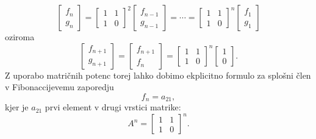 \documentclass[mat1]{fmfdelo}
\begin{document}
\begin{zgled} 
\begin{equation*}
\begin{bmatrix}
            f_n \\
            g_n
        \end{bmatrix}
        =
        \begin{bmatrix}
            1 & 1 \\
            1 & 0
        \end{bmatrix}
        ^2
        \begin{bmatrix}
            f_{n-1} \\
            g_{n-1}
        \end{bmatrix}
        = \cdots =
        \begin{bmatrix}
            1 & 1 \\
            1 & 0
        \end{bmatrix}
        ^n
        \begin{bmatrix}
            f_1 \\
            g_1
        \end{bmatrix}
    \end{equation*}
    oziroma
    \begin{equation*}
        \begin{bmatrix}
            f_{n+1} \\
            g_{n+1}
        \end{bmatrix}
        =
        \begin{bmatrix}
            f_{n+1} \\
            f_n
        \end{bmatrix}
        =
        \begin{bmatrix}
            1 & 1 \\
            1 & 0
        \end{bmatrix}
        ^n
        \begin{bmatrix}
            1 \\
            0
        \end{bmatrix}.
    \end{equation*}
    Z uporabo matričnih potenc torej lahko dobimo ekplicitno formulo za splošni člen v Fibonaccijevemu zaporedju
    \begin{equation*}
        f_n = a_{21},
    \end{equation*}
    kjer je $a_{21}$ prvi element v drugi vrstici matrike:
    \begin{equation*}
        A^n =
        \begin{bmatrix}
            1 & 1 \\
            1 & 0
        \end{bmatrix}
        ^n.
    \end{equation*}
\end{zgled}
\end{document}
